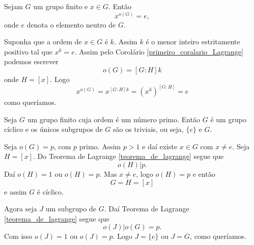 \begin{corolario}
    Sejam $G$ um grupo finito e $x \in G$. Então
    \[
        x^{o(G)} = e,
    \]
    onde $e$ denota o elemento neutro de $G$.
\end{corolario}
\begin{prova}
    Suponha que a ordem de $x \in G$ é $k$. Assim $k$ é o menor inteiro estritamente positivo tal que $x^k = e$. Assim pelo Corolário \eqref{primeiro_coralario_Lagrange} podemos escrever
    \[
        o(G) = [G : H]k
    \]
    onde $H = [x]$. Logo
    \[
        x^{o(G)} = x^{[G : H]k} = (x^k)^{[G : H]} = e
    \]
    como queríamos.
\end{prova}

\begin{corolario}
    Seja $G$ um grupo finito cuja ordem é um n\'umero primo. Então $G$ é um grupo cíclico e os \'unicos subgrupos de $G$ são os triviais, ou seja, $\{e\}$ e $G$.
\end{corolario}
\begin{prova}
    Seja $o(G) = p$, com $p$ primo. Assim $p > 1$ e daí existe $x \in G$ com $x \ne e$. Seja $H = [x]$. Do Teorema de Lagrange \eqref{teorema_de_lagrange} segue que
    \[
        o(H) | p.
    \]
    Daí $o(H) = 1$ ou $o(H) = p$. Mas $x \ne e$, logo $o(H) = p$ e então
    \[
        G = H = [x]
    \]
    e assim $G$ é cíclico.

    Agora seja $J$ um subgrupo de $G$. Daí Teorema de Lagrange \eqref{teorema_de_lagrange} segue que
    \[
        o(J) | o(G) = p.
    \]
    Com isso $o(J) = 1$ ou $o(J) = p$. Logo $J = \{e\}$ ou $J = G$, como queríamos.

\end{prova}
